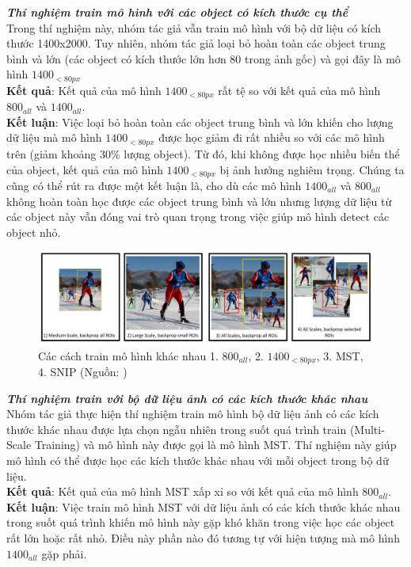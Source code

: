 {    \noindent
    \textbf{\textit{Thí nghiệm train mô hình với các object có kích thước cụ thể}} \\
    Trong thí nghiệm này, nhóm tác giả vẫn train mô hình với bộ dữ liệu có kích thước 1400x2000.
    Tuy nhiên, nhóm tác giả loại bỏ hoàn toàn các object trung bình và lớn (các object có kích thước lớn hơn 80 trong ảnh gốc) và gọi đây là mô hình ${1400}_{<80px}$ \\
    \textbf{Kết quả}: Kết quả của mô hình ${1400}_{<80px}$ rất tệ so với kết quả của mô hình ${800}_{all}$ và ${1400}_{all}$. \\
    \textbf{Kết luận}: Việc loại bỏ hoàn toàn các object trung bình và lớn khiến cho lượng dữ liệu mà mô hình ${1400}_{<80px}$ được học giảm đi rất nhiều so với các mô hình trên (giảm khoảng 30\% lượng object).
    Từ đó, khi không được học nhiều biến thể của object, kết quả của mô hình ${1400}_{<80px}$ bị ảnh hưởng nghiêm trọng.
    Chúng ta cũng có thể rút ra được một kết luận là, cho dù các mô hình ${1400}_{all}$ và ${800}_{all}$ không hoàn toàn học được các object trung bình và lớn nhưng lượng dữ liệu từ các object này vẫn đóng vai trò quan trọng trong việc giúp mô hình detect các object nhỏ. \\

    \begin{figure}[H]
        \centering
        \includegraphics[width=15cm] {images/snip_model_compare}
        \caption{Các cách train mô hình khác nhau 1. ${800}_{all}$, 2. ${1400}_{<80px}$, 3. MST, 4. SNIP (Nguồn: \cite{singh2018analysis})}
        \label{fig:snip_model_compare}
    \end{figure}

    \noindent
    \textbf{\textit{Thí nghiệm train với bộ dữ liệu ảnh có các kích thước khác nhau}} \\
    Nhóm tác giả thực hiện thí nghiệm train mô hình bộ dữ liệu ảnh có các kích thước khác nhau được lựa chọn ngẫu nhiên trong suốt quá trình train (Multi-Scale Training) và mô hình này được gọi là mô hình MST.
    Thí nghiệm này giúp mô hình có thể được học các kích thước khác nhau với mỗi object trong bộ dữ liệu. \\
    \textbf{Kết quả}: Kết quả của mô hình MST xấp xỉ so với kết quả của mô hình ${800}_{all}$. \\
    \textbf{Kết luận}: Việc train mô hình MST với dữ liệu ảnh có các kích thước khác nhau trong suốt quá trình khiến mô hình này gặp khó khăn trong việc học các object rất lớn hoặc rất nhỏ.
    Điều này phần nào đó tương tự với hiện tượng mà mô hình ${1400}_{all}$ gặp phải.

}
